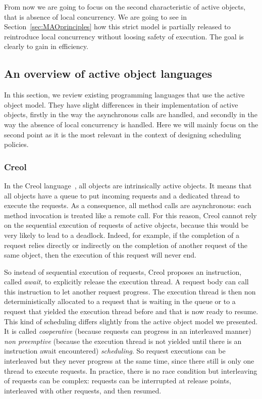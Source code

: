 \documentclass[11pt]{report}
\begin{document}
From now we are going to focus on the second characteristic of active objects, that is absence of local concurrency. We are going to see in Section~\ref{sec:MAOprinciples} how this strict model is partially released to reintroduce local concurrency without loosing safety of execution. The goal is clearly to gain in efficiency.

\subsection{An overview of active object languages}
In this section, we review existing programming languages that use the active object model. They have slight differences in their implementation of active objects, firstly in the way the asynchronous calls are handled, and secondly in the way the absence of local concurrency is handled. Here we will mainly focus on the second point as it is the most relevant in the context of designing scheduling policies.

\subsubsection{Creol}\label{sec:Creol}
In the Creol language~\cite{ref:creol}, all objects are intrinsically active objects. It means that all objects have a queue to put incoming requests and a dedicated thread to execute the requests. As a consequence, all method calls are asynchronous: each method invocation is treated like a remote call. For this reason, Creol cannot rely on the sequential execution of requests of active objects, because this would be very likely to lead to a deadlock. Indeed, for example, if the completion of a request relies directly or indirectly on the completion of another request of the same object, then the execution of this request will never end.

So instead of sequential execution of requests, Creol proposes an instruction, called \emph{await}, to explicitly release the execution thread. A request body can call this instruction to let another request progress.
The execution thread is then non deterministically allocated to a request that is waiting in the queue or to a request that yielded the execution thread before and that is now ready to resume.
This kind of scheduling differs slightly from the active object model we presented. It is called \emph{cooperative} (because requests can progress in an interleaved manner) \emph{non preemptive} (because the execution thread is not yielded until there is an instruction await encountered) \emph{scheduling}. 
So request executions can be interleaved but they never progress at the same time, since there still is only one thread to execute requests. In practice, there is no race condition but interleaving of requests can be complex: requests can be interrupted at release points, interleaved with other requests, and then resumed.
\end{document}
